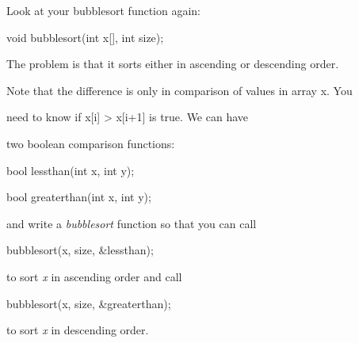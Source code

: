 Look at your bubblesort function again:



\begin{consolethree}[escapeinside=||]

void bubblesort(int x[], int size);

\end{consolethree}



The problem is that it sorts either in ascending or descending order.

Note that the difference is only in comparison of values in array x. You

need to know if x[i] > x[i+1] is true. We can have

two boolean comparison functions:



\begin{consolethree}[escapeinside=||]

bool lessthan(int x, int y);

bool greaterthan(int x, int y);

\end{consolethree}



and write a \textit{bubblesort} function so that you can call



\begin{consolethree}[escapeinside=||]

bubblesort(x, size, &lessthan);

\end{consolethree}



to sort \textit{x} in ascending order and call



\begin{consolethree}[escapeinside=||]

bubblesort(x, size, &greaterthan);

\end{consolethree}



to sort \textit{x} in descending order.

